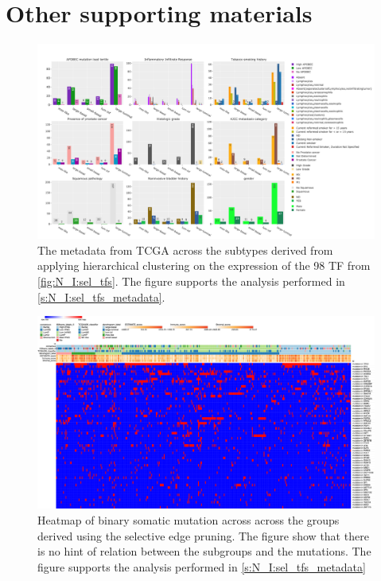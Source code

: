 \section{Other supporting materials}

\begin{figure}
    \centering
    \includegraphics[width=1.0\textwidth,keepaspectratio]{Sections/Network_I/Resources/selective_pruning/sel_tfs/sel_tfs_tcga_meta.png}
      \caption[TCGA metadata and the groups derived from the 98 TF]{The metadata from TCGA \cite{Robertson2017-mg} across the subtypes derived from applying hierarchical clustering on the expression of the 98 TF from \cref{fig:N_I:sel_tfs}. The figure supports the analysis performed in \cref{s:N_I:sel_tfs_metadata}.}
    \label{fig:ap:sel_tfs_tcga_metadata}
\end{figure} 

\newpage 


\begin{figure}
    \centering
\includegraphics[width=1.0\textwidth,height=1.0\textheight,keepaspectratio]{Sections/Network_I/Resources/selective_pruning/sel_tfs/sel_tfs_mut_meta.png}
      \caption[98 TF: subgroups and somatic mutations]{Heatmap of binary somatic mutation across across the groups derived using the selective edge pruning. The figure show that there is no hint of relation between the subgroups and the mutations. The figure supports the analysis performed in \cref{s:N_I:sel_tfs_metadata}}
    \label{fig:ap:sel_tfs_tcga_meta_mut}
\end{figure}